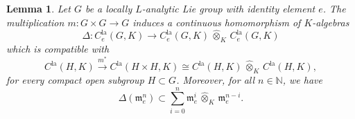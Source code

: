 \documentclass[a4paper, reqno, 10pt]{amsart}
\newtheorem{lemma}[theorem]{Lemma}
\theoremstyle{definition}
\numberwithin{equation}{section}
\newcommand{\cotimes}[1]{{\,\widehat{\otimes}_{#1}\,}}
\newcommand{\la}{{\mathrm{la}}}
\newcommand{\lra}{\longrightarrow}
\newcommand{\ra}{\rightarrow}
\newcommand{\BN}{{\mathbb {N}}}
\newcommand{\Fm}{{\mathfrak {m}}}
\begin{document}
\begin{lemma}\label{Lemma 1 - Comultiplication map for germs of locally analytic functions}
	Let $G$ be a locally $L$-analytic Lie group with identity element $e$.
	The multiplication $m\colon G\times G \ra G$ induces a continuous homomorphism of $K$-algebras 
	\begin{equation}\label{Eq 1 - Comultiplication map for germs of locally analytic functions}
		\Delta \colon C^\la_e(G,K) \lra C^\la_e (G,K) \cotimes{K} C^\la_e(G,K)
	\end{equation}
	which is compatible with 
	\begin{equation*}
		C^\la(H,K) \overset{m^\ast}{\lra} C^\la(H\times H,K) \cong C^\la(H,K) \cotimes{K} C^\la(H,K) ,
	\end{equation*}
	for every compact open subgroup $H\subset G$.
	Moreover, for all $n\in \BN$, we have
	\begin{equation*}
		\Delta(\Fm_e^n) \subset \sum_{i=0}^n \Fm_e^i \cotimes{K} \Fm_e^{n-i}.
	\end{equation*}
\end{lemma}
\end{document}
